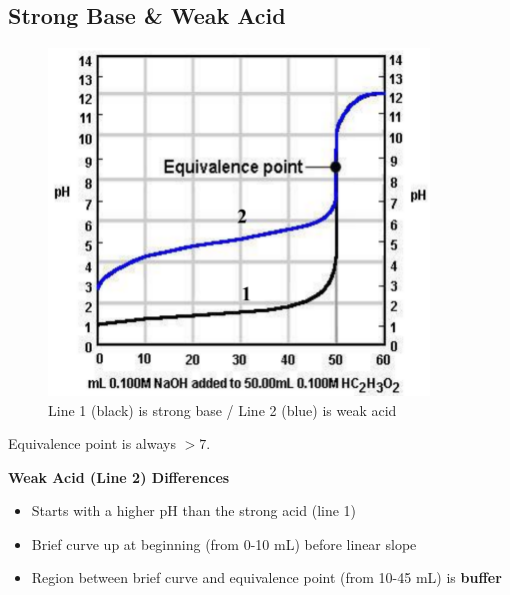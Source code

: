 \documentclass[a4paper,12pt]{article}
\begin{document}
\subsection{Strong Base \& Weak Acid}
\begin{figure}[H]
    \centering
    \includegraphics[width=0.9\textwidth]{strongbase-weakacid}
    \caption{Line 1 (black) is strong base / Line 2 (blue) is weak acid}
\end{figure}

Equivalence point is always $> 7$.

\textbf{Weak Acid (Line 2) Differences}
\begin{itemize}
    \item{Starts with a higher pH than the strong acid (line 1)}
    \item{Brief curve up at beginning (from 0-10 mL) before linear slope}
    \item{Region between brief curve and equivalence point (from 10-45 mL) is \textbf{buffer}}
\end{itemize}
\end{document}
